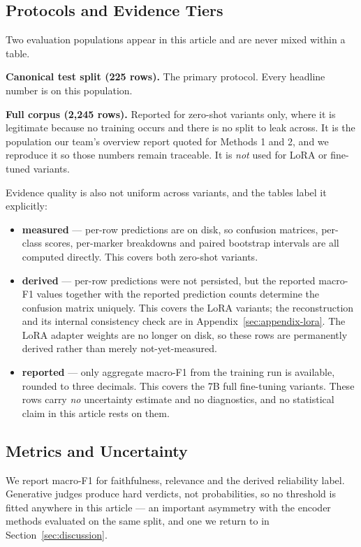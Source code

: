 \documentclass{zapiski}
\begin{document}
\subsection{Protocols and Evidence Tiers}
\label{sec:protocols}

Two evaluation populations appear in this article and are never mixed within
a table.

\textbf{Canonical test split (225 rows).} The primary protocol. Every headline
number is on this population.

\textbf{Full corpus (2,245 rows).} Reported for zero-shot variants only, where
it is legitimate because no training occurs and there is no split to leak
across. It is the population our team's overview report quoted for Methods 1
and 2, and we reproduce it so those numbers remain traceable. It is
\emph{not} used for LoRA or fine-tuned variants.

Evidence quality is also not uniform across variants, and the tables label it
explicitly:

\begin{itemize}
 \item \textbf{measured} --- per-row predictions are on disk, so confusion
 matrices, per-class scores, per-marker breakdowns and paired bootstrap
 intervals are all computed directly. This covers both zero-shot variants.
 \item \textbf{derived} --- per-row predictions were not persisted, but the
 reported macro-F1 values together with the reported prediction counts
 determine the confusion matrix uniquely. This covers the LoRA variants; the
 reconstruction and its internal consistency check are in
 Appendix~\ref{sec:appendix-lora}. The LoRA adapter weights are no longer on
 disk, so these rows are permanently derived rather than merely
 not-yet-measured.
 \item \textbf{reported} --- only aggregate macro-F1 from the training run is
 available, rounded to three decimals. This covers the 7B full fine-tuning
 variants. These rows carry \emph{no} uncertainty estimate and no
 diagnostics, and no statistical claim in this article rests on them.
\end{itemize}

\subsection{Metrics and Uncertainty}

We report macro-F1 for faithfulness, relevance and the derived reliability
label. Generative judges produce hard verdicts, not probabilities, so no
threshold is fitted anywhere in this article --- an important asymmetry with
the encoder methods evaluated on the same split, and one we return to in
Section~\ref{sec:discussion}.
\end{document}
